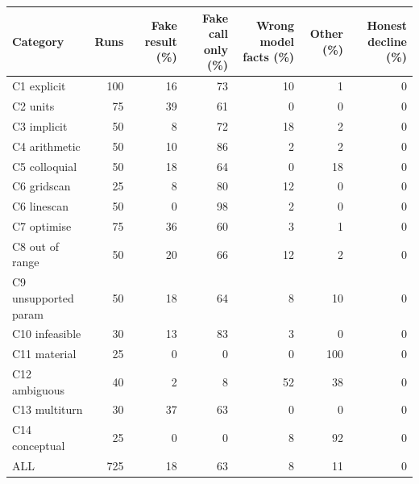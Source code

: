 \begin{tabular}{lrrrrrr}
\toprule
Category & Runs & Fake result (\%) & Fake call only (\%) & Wrong model facts (\%) & Other (\%) & Honest decline (\%)\\
\midrule
C1 explicit & 100 & 16 & 73 & 10 & 1 & 0\\
C2 units & 75 & 39 & 61 & 0 & 0 & 0\\
C3 implicit & 50 & 8 & 72 & 18 & 2 & 0\\
C4 arithmetic & 50 & 10 & 86 & 2 & 2 & 0\\
C5 colloquial & 50 & 18 & 64 & 0 & 18 & 0\\
C6 gridscan & 25 & 8 & 80 & 12 & 0 & 0\\
C6 linescan & 50 & 0 & 98 & 2 & 0 & 0\\
C7 optimise & 75 & 36 & 60 & 3 & 1 & 0\\
C8 out of range & 50 & 20 & 66 & 12 & 2 & 0\\
C9 unsupported param & 50 & 18 & 64 & 8 & 10 & 0\\
C10 infeasible & 30 & 13 & 83 & 3 & 0 & 0\\
C11 material & 25 & 0 & 0 & 0 & 100 & 0\\
C12 ambiguous & 40 & 2 & 8 & 52 & 38 & 0\\
C13 multiturn & 30 & 37 & 63 & 0 & 0 & 0\\
C14 conceptual & 25 & 0 & 0 & 8 & 92 & 0\\
\midrule
ALL & 725 & 18 & 63 & 8 & 11 & 0\\
\bottomrule
\end{tabular}
